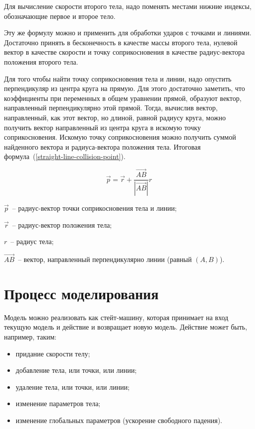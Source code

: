 Для вычисление скорости второго тела, надо поменять местами нижние индексы, обозначающие первое и второе тело.

Эту же формулу можно и применить для обработки ударов с точками и линиями. Достаточно принять в бесконечность в качестве массы второго тела,
нулевой вектор в качестве скорости и точку соприкосновения в качестве радиус-вектора положения второго тела.

Для того чтобы найти точку соприкосновения тела и линии, надо опустить перпендикуляр из центра круга на прямую.
Для этого достаточно заметить, что коэффициенты при переменных в общем уравнении прямой,
образуют вектор, направленный перпендикулярно этой прямой. Тогда, вычислив вектор, направленный, как этот вектор, но
длиной, равной радиусу круга, можно получить вектор направленный из центра круга в искомую точку соприкосновения.
Искомую точку соприкосновения можно получить суммой найденного вектора и радиуса-вектора положения тела.
Итоговая формула~(\ref{straight-line-collision-point}).

\begin{equation}\label{straight-line-collision-point}
  \vec{p} = \vec{r} + \frac{\vec{AB}}{\left|\vec{AB}\right|} r
\end{equation}

\begin{Underequation}
  \(\vec{p}\)~-- радиус-вектор точки соприкосновения тела и линии;

  \(\vec{r}\)~-- радиус-вектор положения тела;

  \(r\)~-- радиус тела;

  \(\vec{AB}\)~-- вектор, направленный перпендикулярно линии (равный \((A, B)\)).
\end{Underequation}

\section{Процесс моделирования}\label{statemachine_1}

Модель можно реализовать как стейт-машину, которая принимает на вход
текущую модель и действие и возвращает новую модель. Действие может быть, например, таким:

\begin{itemize}
  \item придание скорости телу;
  \item добавление тела, или точки, или линии;
  \item удаление тела, или точки, или линии;
  \item изменение параметров тела;
  \item изменение глобальных параметров (ускорение свободного падения).
\end{itemize}


